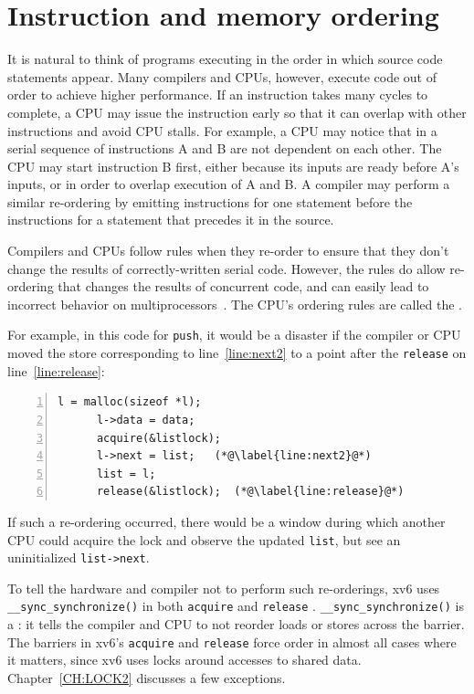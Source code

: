 \section{Instruction and memory ordering}

It is natural to think of programs executing in the order
in which source code statements appear.
Many
compilers and CPUs, however, execute code out of order
to achieve
higher performance.  If an instruction takes many cycles to complete,
a CPU may issue the instruction early so that it can
overlap with other instructions and avoid CPU stalls. For
example, a CPU may notice that in a serial sequence of
instructions A and B are not dependent on each other.
The CPU may start instruction B first, either because its
inputs are ready before A's inputs, or in order to overlap
execution of A and B.
A compiler may perform a similar re-ordering by emitting instructions
for one statement before the instructions for a statement that precedes it
in the source.

Compilers and CPUs follow rules when they re-order to
ensure that they don't change the results of correctly-written
serial code.
However, the rules do allow re-ordering that
changes the results of concurrent code,
and can easily lead to incorrect behavior on
multiprocessors~\cite{riscv:user,boehm04}.
The CPU's ordering rules are called the .

For example, in this code for
\lstinline{push},
it would be a disaster if the compiler or CPU moved the
store corresponding to
line~\ref{line:next2} to a point after the
\lstinline{release}
on line~\ref{line:release}:
\begin{lstlisting}[numbers=left,firstnumber=1]
      l = malloc(sizeof *l);
      l->data = data;
      acquire(&listlock);
      l->next = list;   (*@\label{line:next2}@*)
      list = l;      
      release(&listlock);  (*@\label{line:release}@*)
\end{lstlisting}
If such a re-ordering occurred, there would be a window during
which another CPU could acquire the lock and
observe the updated
\lstinline{list},
but see an uninitialized
\lstinline{list->next}.

To tell the hardware and compiler not to perform such re-orderings,
xv6 uses
\lstinline{__sync_synchronize()} 
in both
\lstinline{acquire} 
and
\lstinline{release} .
\lstinline{__sync_synchronize()}
is a :
it tells the compiler and CPU to not reorder loads or stores across the
barrier.
The barriers in xv6's 
\lstinline{acquire}
and
\lstinline{release}
force order in almost all cases where it matters,
since xv6 uses locks around accesses to shared data.
Chapter~\ref{CH:LOCK2} discusses a few exceptions.

